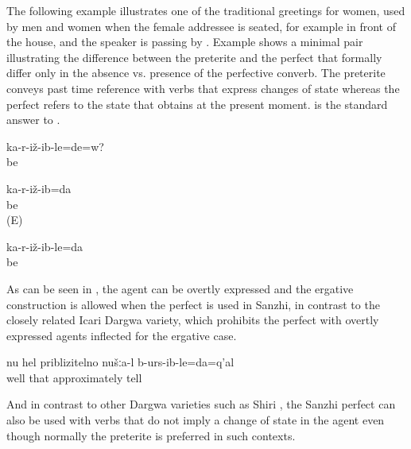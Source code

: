 The following example illustrates one of the traditional greetings for women, used by men and women when the female addressee is seated, for example in front of the house, and the speaker is passing by . Example  shows a minimal pair illustrating the difference between the preterite and the perfect that formally differ only in the absence vs. presence of the perfective converb. The preterite conveys past time reference with verbs that express changes of state whereas the perfect refers to the state that obtains at the present moment.  is the standard answer to .
%
\begin{exe}
	\ex	\label{ex:Are you sitting (seated) analytic}
	\gll	ka-r-iž-ib-le=de=w?\\
		be\\
	\glt	{}

	\ex	\label{ex:I am sitting sat down analytic}
	\begin{xlist}
		\ex	\label{ex:I sat down analytic}
		\gll	ka-r-iž-ib=da\\
			be\\
		\glt	{} (E)

		\ex	\label{ex:I am sitting analytic}
		\gll	ka-r-iž-ib-le=da\\
			be\\
		\glt	{}
	\end{xlist}
\end{exe}

As can be seen in , the agent can be overtly expressed and the ergative construction is allowed when the perfect is used in Sanzhi, in contrast to the closely related Icari Dargwa variety, which prohibits the perfect with overtly expressed agents inflected for the ergative case.
%
\begin{exe}
	\ex	\label{ex:Well, approximately we already said it analytic}
	\gll	nu	hel	priblizitelno	nušːa-l	b-urs-ib-le=da=q'al\\
		well	that	approximately		tell\\
	\glt	{}
	\end{exe}
	
And in contrast to other Dargwa varieties such as Shiri \citep{BelyaevInPreparation}, the Sanzhi perfect can also be used with verbs that do not imply a change of state in the agent  even though normally the preterite is preferred in such contexts. 


